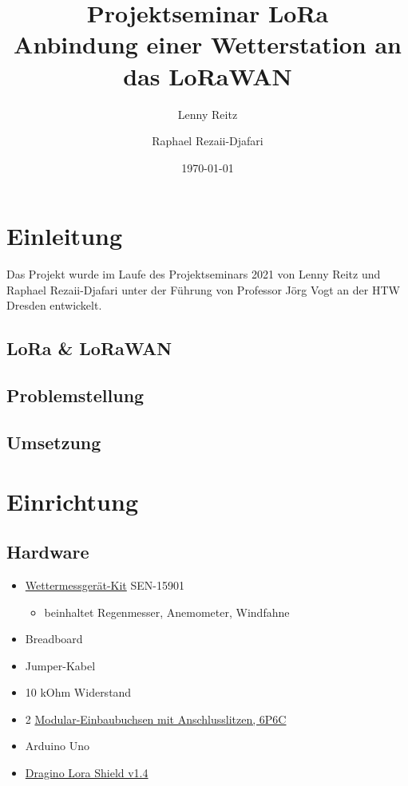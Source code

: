 \documentclass{article}
\title{Projektseminar LoRa \\ \large Anbindung einer Wetterstation an das LoRaWAN}
\date{\today}
\author{
  Lenny Reitz\\
  \and
  Raphael Rezaii-Djafari\\
}
\begin{document}
  \maketitle
  \newpage
  \tableofcontents
  \newpage

  \section{Einleitung}

    Das Projekt wurde im Laufe des Projektseminars 2021 von Lenny Reitz und Raphael Rezaii-Djafari unter der Führung von Professor Jörg Vogt an der HTW Dresden entwickelt.

    \subsection{LoRa \& LoRaWAN}

    \subsection{Problemstellung}

    \subsection{Umsetzung}


  \section{Einrichtung}

    \subsection{Hardware}

      \begin{itemize}
        \item\href{https://learn.sparkfun.com/tutorials/weather-meter-hookup-guide#resources-and-going-further}{Wettermessgerät-Kit} SEN-15901
        
        \begin{itemize}
          \item beinhaltet Regenmesser, Anemometer, Windfahne
        \end{itemize}

        \item Breadboard
        \item Jumper-Kabel
        \item 10 kOhm Widerstand
        \item 2 \href{https://www.pollin.de/p/modular-einbaubuchse-mit-anschlusslitzen-6p6c-541843}{Modular-Einbaubuchsen mit Anschlusslitzen, 6P6C}
        \item Arduino Uno
        \item \href{https://wiki.dragino.com/index.php?title=Lora_Shield}{Dragino Lora Shield v1.4}
      \end{itemize}
\end{document}
